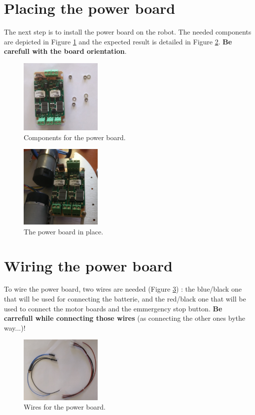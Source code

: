 \documentclass[10pt,a4paper]{report}   %
\begin{document}
\section{Placing the power board}

The next step is to install the power board on the robot. The needed components are depicted in Figure \ref{fig:23} and the expected result is detailed in Figure \ref{fig:24}. \textbf{Be carefull with the board orientation}.

\begin{figure}[H]
\center
\includegraphics[width=150px]{images/23.jpg}
\caption{Components for the power board.}
\label{fig:23}
\end{figure}

\begin{figure}[H]
\center

\includegraphics[width=150px]{images/24.jpg}
\caption{The power board in place.}
\label{fig:24}
\end{figure}

\section{Wiring the power board}

To wire the power board, two wires are needed (Figure \ref{fig:25}) : the blue/black one that will be used for connecting the batterie, and the red/black one that will be used to connect the motor boards and the emmergency stop button. \textbf{Be carrefull while connecting those wires} (as connecting the other ones bythe way...)!

\begin{figure}[H]
\center
\includegraphics[width=150px]{images/25.jpg}
\caption{Wires for the power board.}
\label{fig:25}
\end{figure}
\end{document}
